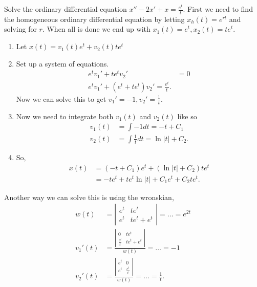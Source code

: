  \begin{eg}
    Solve the ordinary differential equation $x''-2x'+x=\frac{e^{t}}{t}$. First we need to find the homogeneous ordinary differential equation by letting $x_h(t)=e^{rt}$ and solving for $r$. When all is done we end up with $x_1(t)=e^{t},x_2(t)=te^{t}$.
    \begin{enumerate}
      \item Let $x(t)=v_1(t)e^{t}+v_2(t)te^{t}$
      \item Set up a system of equations.
        \begin{align*}
          e^{t}v_1'+te^{t}v_2'&=0\\
          e^{t}v_1'+\left( e^{t}+te^{t} \right)v_2'=\frac{e^{t}}{t} 
        .\end{align*}
        Now we can solve this to get $v_1'=-1,v_2'=\frac{1}{t}$.
      \item Now we need to integrate both $v_1(t)$ and $v_2(t) $ like so
        \begin{align*}
          v_1(t)&=\int -1dt=-t+C_1\\
          v_2(t)&=\int \frac{1}{t}dt=\ln|t|+C_2
        .\end{align*}
      \item So,
        \begin{align*}
          x(t)&=(-t+C_1)e^{t}+\left( \ln|t|+C_2 \right) te^{t}\\
              &=-te^{t}+te^{t}\ln|t|+C_1e^{t}+C_2te^{t}
        .\end{align*}
    \end{enumerate}
    Another way we can solve this is using the wronskian,
    \begin{align*}
      w(t)&= \left| \begin{matrix} e^{t}&te^{t}\\e^{t}&te^{t}+e^{t} \end{matrix} \right| = \ldots=e^{2t}\\
      v_1'(t)&=\frac{\left| \begin{matrix} 0&te^{t}\\\frac{e^{t}}{t}&te^{t}+e^{t} \end{matrix} \right| }{w(t)}=\ldots=-1\\
      v_2'(t)&=\frac{\left| \begin{matrix} e^{t}&0\\e^{t}&\frac{e^{t}}{t} \end{matrix} \right| }{w(t)}=\ldots=\frac{1}{t}
    .\end{align*}
  \end{eg}
